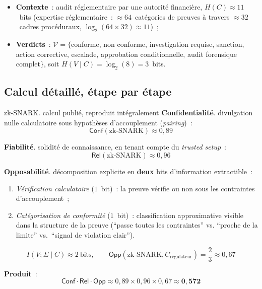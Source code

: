 \begin{itemize}
    \item \textbf{Contexte}~: audit réglementaire par une autorité
          financière, $H(C) \approx 11$~bits (expertise réglementaire~:
          $\approx 64$~catégories de preuves à travers
          $\approx 32$~cadres procéduraux,
          $\log_2(64\times 32) \approx 11$)~;
    \item \textbf{Verdicts}~: $\mathcal{V} = \{$conforme, non conforme,
          investigation requise, sanction, action corrective,
          escalade, approbation conditionnelle, audit forensique
          complet$\}$, soit $H(V\mid C) = \log_2(8) = 3$~bits.
\end{itemize}

\subsection{Calcul détaillé, étape par étape}

\begin{boxoutils}{zk-SNARK. calcul publié, reproduit intégralement}
\textbf{Confidentialité}. divulgation nulle calculatoire sous
hypothèses d'accouplement (\textit{pairing})~:
\[
\mathsf{Conf}(\text{zk-SNARK}) \approx 0{,}89
\]

\textbf{Fiabilité}. solidité de connaissance, en tenant compte
du \textit{trusted setup}~:
\[
\mathsf{Rel}(\text{zk-SNARK}) \approx 0{,}96
\]

\textbf{Opposabilité}. décomposition explicite en \textbf{deux}
bits d'information extractible~:
\begin{enumerate}
    \item \textit{Vérification calculatoire} ($1$~bit)~: la preuve
          vérifie ou non sous les contraintes d'accouplement~;
    \item \textit{Catégorisation de conformité} ($1$~bit)~:
          classification approximative visible dans la structure
          de la preuve (``passe toutes les contraintes'' vs.
          ``proche de la limite'' vs.\ ``signal de violation clair'').
\end{enumerate}
\[
I(V;\Sigma\mid C) \approx 2~\text{bits}, \qquad
\mathsf{Opp}(\text{zk-SNARK}, C_{\text{régulateur}}) =
\frac{2}{3} \approx 0{,}67
\]

\textbf{Produit}~:
\[
\mathsf{Conf}\cdot\mathsf{Rel}\cdot\mathsf{Opp} \approx
0{,}89 \times 0{,}96 \times 0{,}67 \approx \mathbf{0{,}572}
\]
\end{boxoutils}

